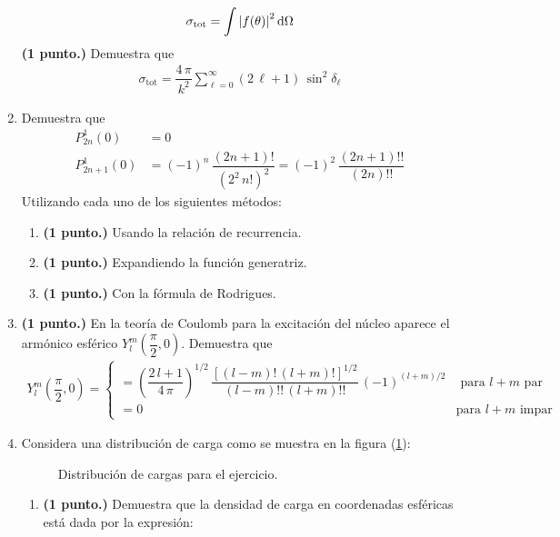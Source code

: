 \begin{enumerate}
\begin{align*}
\sigma_{\text{tot}} = \int \abs{f(\theta)}^{2} \dd{\Omega}
\end{align*}
\textbf{(1 punto.) } Demuestra que
\begin{align*}
\sigma_{\text{tot}} = \dfrac{4 \, \pi}{k^{2}} \sum_{\ell=0}^{\infty} (2 \, \ell + 1) \, \sin^{2} \delta_{\ell}
\end{align*}
\item Demuestra que
\begin{align*}
P_{2n}^{1} (0) &= 0 \\
P_{2n+1}^{1} (0) &= (-1)^{n} \, \dfrac{(2n + 1)!}{(2^{2} \, n!)^{2}} = (-1)^{2} \, \dfrac{(2n + 1)!!}{(2n)!!}
\end{align*}
Utilizando cada uno de los siguientes métodos:
\begin{enumerate}
\item \textbf{(1 punto.)} Usando la relación de recurrencia.
\item \textbf{(1 punto.)} Expandiendo la función generatriz.
\item \textbf{(1 punto.)} Con la fórmula de Rodrigues.
\end{enumerate}
\item \textbf{(1 punto.)} En la teoría de Coulomb para la excitación del núcleo aparece el armónico esférico $Y_{l}^{m} \left( \dfrac{\pi}{2}, 0 \right)$. Demuestra que
\begin{align*}
Y_{l}^{m} \left( \dfrac{\pi}{2}, 0 \right) = \begin{cases}
= \left( \dfrac{2 \, l +1}{4 \, \pi} \right)^{1/2} \, \dfrac{\left[ (l - m)! \, (l + m)! \right]^{1/2}}{(l - m)!! \, (l + m)!!} \, (-1)^{(l + m)/2} & \mbox{ para } l + m \mbox{ par} \\[0.5em]
= 0 & \mbox{para } l + m \mbox{ impar}
\end{cases}
\end{align*}
\item Considera una distribución de carga como se muestra en la figura (\ref{fig:figura_multipolo_01}):
\begin{figure}[!ht]
    \centering
    
    \caption{Distribución de cargas para el ejercicio.}
    \label{fig:figura_multipolo_01}
\end{figure}
\begin{enumerate}
\item \textbf{(1 punto.) } Demuestra que la densidad de carga en coordenadas esféricas está dada por la expresión:

\end{enumerate}
\end{enumerate}
